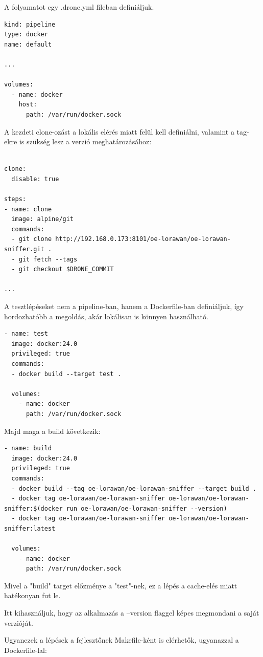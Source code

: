 A folyamatot egy .drone.yml fileban definiáljuk.

\begin{lstlisting}
kind: pipeline
type: docker
name: default

...

volumes:
  - name: docker
    host:
      path: /var/run/docker.sock
\end{lstlisting}

A kezdeti clone-ozást a lokális elérés miatt felül kell definiálni, valamint a tag-ekre is szükség lesz a verzió meghatározásához:

\begin{lstlisting}

clone:
  disable: true

steps:
- name: clone
  image: alpine/git
  commands:
  - git clone http://192.168.0.173:8101/oe-lorawan/oe-lorawan-sniffer.git .
  - git fetch --tags
  - git checkout $DRONE_COMMIT

...
\end{lstlisting}


A tesztlépéseket nem a pipeline-ban, hanem a Dockerfile-ban definiáljuk, így hordozhatóbb a megoldás, akár lokálisan is könnyen használható.

\begin{lstlisting}
- name: test
  image: docker:24.0
  privileged: true
  commands:
  - docker build --target test .

  volumes:
    - name: docker
      path: /var/run/docker.sock
\end{lstlisting}

Majd maga a build következik:

\begin{lstlisting}
- name: build
  image: docker:24.0
  privileged: true
  commands:
  - docker build --tag oe-lorawan/oe-lorawan-sniffer --target build .
  - docker tag oe-lorawan/oe-lorawan-sniffer oe-lorawan/oe-lorawan-sniffer:$(docker run oe-lorawan/oe-lorawan-sniffer --version)
  - docker tag oe-lorawan/oe-lorawan-sniffer oe-lorawan/oe-lorawan-sniffer:latest

  volumes:
    - name: docker
      path: /var/run/docker.sock
\end{lstlisting}

Mivel a "build" target előzménye a "test"-nek, ez a lépés a cache-elés miatt hatékonyan fut le.

Itt kihasználjuk, hogy az alkalmazás a --version flaggel képes megmondani a saját verzióját.

Ugyanezek a lépések a fejlesztőnek Makefile-ként is elérhetők, ugyanazzal a Dockerfile-lal:


